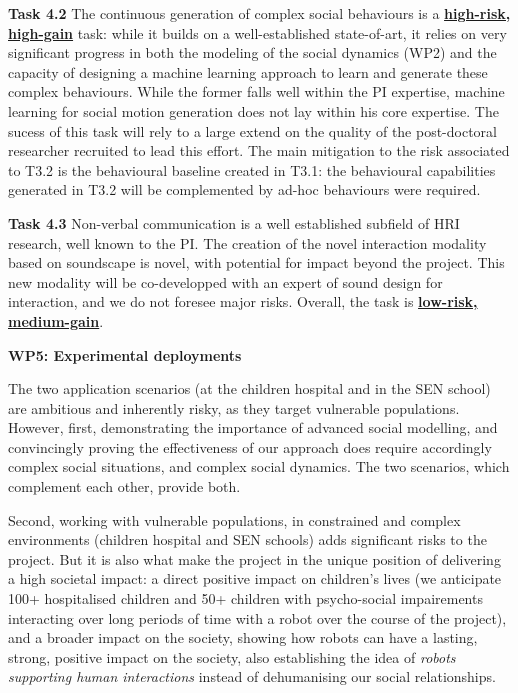\documentclass[11pt,a4paper]{report}
\begin{document}
\textbf{Task 4.2} The continuous generation of complex social behaviours is a
\ul{\bf high-risk, high-gain} task: while it builds on a well-established
state-of-art, it relies on very significant progress in both the modeling of the
social dynamics (WP2) and the capacity of designing a machine learning approach
to learn and generate these complex behaviours. While the former falls well
within the PI expertise, machine learning for social motion generation does not
lay within his core expertise. The sucess of this task will rely to a large
extend on the quality of the post-doctoral researcher recruited to lead this
effort. The main mitigation to the risk associated to T3.2 is the behavioural
baseline created in T3.1: the behavioural capabilities generated in T3.2 will be
complemented by ad-hoc behaviours were required.

\textbf{Task 4.3} Non-verbal communication is a well established subfield of HRI
research, well known to the PI. The creation of the novel interaction modality
based on soundscape is novel, with potential for impact beyond the project. This
new modality will be co-developped with an expert of sound design for
interaction, and we do not foresee major risks. Overall, the task is \ul{\bf
low-risk, medium-gain}.

\vspace{1em}

\textbf{WP5: Experimental deployments}

The two application scenarios (at the children hospital and in the SEN school)
are ambitious and inherently risky, as they target vulnerable populations.
However, first, demonstrating the importance of advanced social modelling, and
convincingly proving the effectiveness of our approach does require accordingly
complex social situations, and complex social dynamics. The two scenarios, which
complement each other, provide both.

Second, working with vulnerable populations, in constrained and complex
environments (children hospital and SEN schools) adds significant risks to the
project. But it is also what make the project in the unique position of
delivering a high societal impact: a direct positive impact on children's lives
(we anticipate 100+ hospitalised children and 50+ children with psycho-social
impairements interacting over long periods of time with a robot over the course
of the project), and a broader impact on the society, showing how robots can
have a lasting, strong, positive impact on the society, also establishing the
idea of \emph{robots supporting human interactions} instead of dehumanising our
social relationships.
\end{document}
